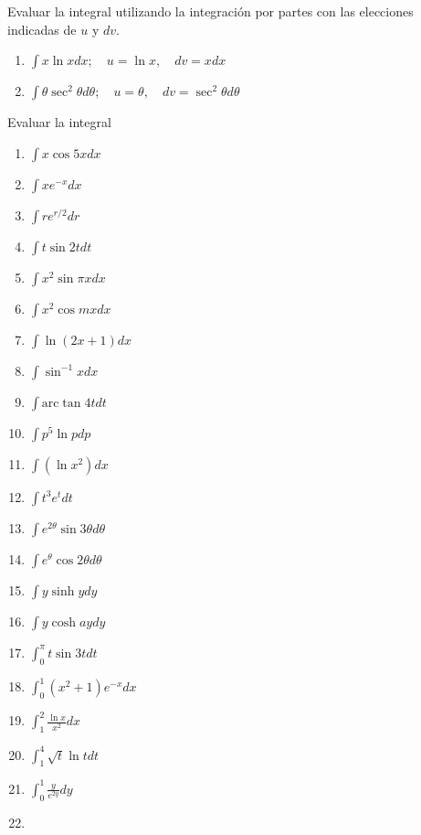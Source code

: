\documentclass[12pt,]{article}
\begin{document}
Evaluar la integral utilizando la integración por partes con las
elecciones indicadas de \(u\) y \(dv\).

\begin{enumerate}
\def\labelenumi{\arabic{enumi}.}
\item
  \(\displaystyle\int x \ln x dx;\quad u=\ln x,\quad dv=x dx\)
\item
  \(\displaystyle\int\theta\sec^2\theta d\theta;\quad u=\theta,\quad dv=\sec^2\theta d\theta\)
\end{enumerate}

Evaluar la integral

\begin{enumerate}
\def\labelenumi{\arabic{enumi}.}
\setcounter{enumi}{2}
\item
  \(\displaystyle\int x\cos 5x dx\)
\item
  \(\displaystyle\int xe^{-x}dx\)
\item
  \(\displaystyle\int re^{r/2}dr\)
\item
  \(\displaystyle\int t\sin 2tdt\)
\item
  \(\displaystyle\int x^2\sin\pi x dx\)
\item
  \(\displaystyle\int x^2\cos mx dx\)
\item
  \(\displaystyle\int \ln(2x+1)dx\)
\item
  \(\displaystyle\int \sin^{-1}xdx\)
\item
  \(\displaystyle\int\text{arc}\tan4tdt\)
\item
  \(\displaystyle\int p^{5}\ln pdp\)
\item
  \(\displaystyle\int(\ln x^2)dx\)
\item
  \(\displaystyle\int t^3e^tdt\)
\item
  \(\displaystyle\int e^{2\theta}\sin 3\theta d\theta\)
\item
  \(\displaystyle\int e^{\theta}\cos2\theta d\theta\)
\item
  \(\displaystyle\int y\sinh y dy\)
\item
  \(\displaystyle\int y \cosh ay dy\)
\item
  \(\displaystyle\int_0^\pi t\sin3t dt\)
\item
  \(\displaystyle\int_0^1(x^2+1)e^{-x}dx\)
\item
  \(\displaystyle\int_1^2\frac{\ln x}{x^2}dx\)
\item
  \(\displaystyle\int_1^4\sqrt{t}\ln t dt\)
\item
  \(\displaystyle\int_0^1\frac{y}{e^{2y}}dy\)
\item

\end{enumerate}
\end{document}
